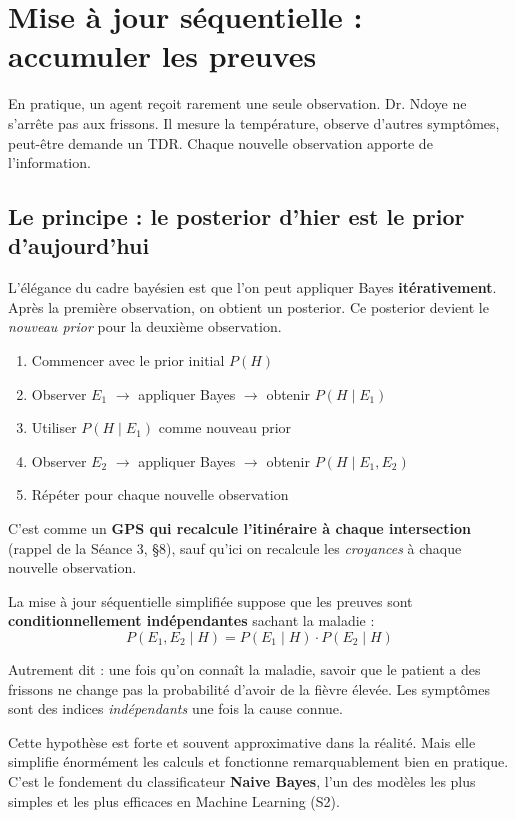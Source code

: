 \documentclass[11pt,a4paper]{article}
\begin{document}
\section{Mise à jour séquentielle : accumuler les preuves}

En pratique, un agent reçoit rarement une seule observation. Dr. Ndoye ne s'arrête pas aux frissons. Il mesure la température, observe d'autres symptômes, peut-être demande un TDR. Chaque nouvelle observation apporte de l'information.

\subsection{Le principe : le posterior d'hier est le prior d'aujourd'hui}

L'élégance du cadre bayésien est que l'on peut appliquer Bayes \textbf{itérativement}. Après la première observation, on obtient un posterior. Ce posterior devient le \textit{nouveau prior} pour la deuxième observation.

\begin{recipebox}
\begin{enumerate}
    \item Commencer avec le prior initial $P(H)$
    \item Observer $E_1$ $\to$ appliquer Bayes $\to$ obtenir $P(H \mid E_1)$
    \item Utiliser $P(H \mid E_1)$ comme nouveau prior
    \item Observer $E_2$ $\to$ appliquer Bayes $\to$ obtenir $P(H \mid E_1, E_2)$
    \item Répéter pour chaque nouvelle observation
\end{enumerate}

C'est comme un \textbf{GPS qui recalcule l'itinéraire à chaque intersection} (rappel de la Séance 3, §8), sauf qu'ici on recalcule les \textit{croyances} à chaque nouvelle observation.
\end{recipebox}

\begin{attentionbox}
La mise à jour séquentielle simplifiée suppose que les preuves sont \textbf{conditionnellement indépendantes} sachant la maladie :
$$P(E_1, E_2 \mid H) = P(E_1 \mid H) \cdot P(E_2 \mid H)$$

Autrement dit  : une fois qu'on connaît la maladie, savoir que le patient a des frissons ne change pas la probabilité d'avoir de la fièvre élevée. Les symptômes sont des indices \textit{indépendants} une fois la cause connue.

Cette hypothèse est forte et souvent approximative dans la réalité. Mais elle simplifie énormément les calculs et fonctionne remarquablement bien en pratique. C'est le fondement du classificateur \textbf{Naive Bayes}, l'un des modèles les plus simples et les plus efficaces en Machine Learning (S2).
\end{attentionbox}
\end{document}
